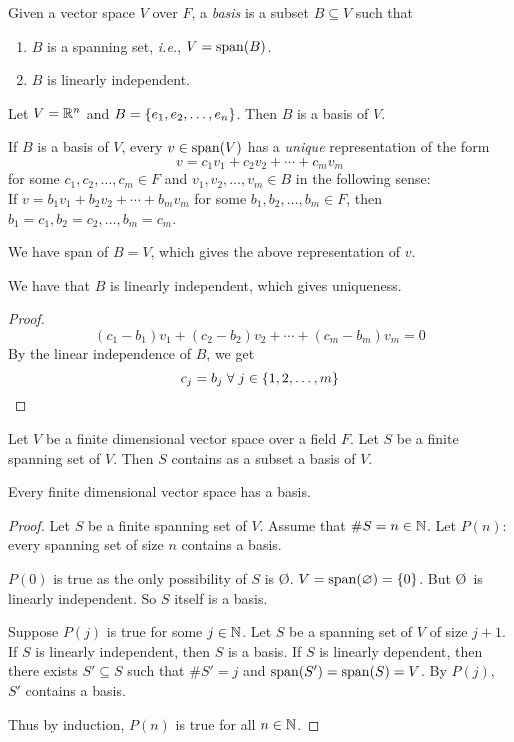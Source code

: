\begin{defn}[Basis] \label{defn:basis}
    Given a vector space $V$ over $F$, a \emph{basis} is a subset $B \subseteq V$ such that
    \begin{enumerate}[label=(\alph*)]
        \item $B$ is a spanning set, \textit{i.e.}, $V = \operatorname{span}(B)$.
        \item $B$ is linearly independent.
    \end{enumerate}
\end{defn}
\begin{example}
    Let $V = \mathbb{R}^{n}$ and $B = \set{e_{1}, e_{2}, \dots, e_{n}}$. Then $B$ is a basis of $V$.
\end{example}
\begin{rem}
    If $B$ is a basis of $V$, every $v \in \operatorname{span}(V)$ has a \emph{unique} representation of the form \[
        v = c_{1} v_{1} + c_{2} v_{2} + \cdots + c_{m} v_{m}
    \] for some $c_{1}, c_{2}, \dots, c_{m} \in F$ and $v_{1}, v_{2}, \dots, v_{m} \in B$ in the following sense: \\
    If $v = b_{1} v_{1} + b_{2} v_{2} + \cdots + b_{m} v_{m}$ for some $b_{1}, b_{2}, \dots, b_{m} \in F$, then $b_{1} = c_{1}, b_{2} = c_{2}, \dots, b_{m} = c_{m}$.

    We have span of $B = V$, which gives the above representation of $v$.

    We have that $B$ is linearly independent, which gives uniqueness.
    \begin{proof}
        \[
            (c_{1} - b_{1}) v_{1} + (c_{2} - b_{2}) v_{2} + \cdots + (c_{m} - b_{m}) v_{m} = 0
        \] By the linear independence of $B$, we get \[
            c_{j} = b_{j} \;\forall\; j \in \set{1, 2, \dots, m} \qedhere
        \]
    \end{proof}
\end{rem}

\begin{cor}[]
    Let $V$ be a finite dimensional vector space over a field $F$.
    Let $S$ be a finite spanning set of $V$.
    Then $S$ contains as a subset a basis of $V$.
\end{cor}
\begin{cor}[]
    Every finite dimensional vector space has a basis.
\end{cor}
\begin{proof}
    Let $S$ be a finite spanning set of $V$.
    Assume that $\#S = n \in \mathbb{N}$.
    Let $P(n)$: every spanning set of size $n$ contains a basis.

    $P(0)$ is true as the only possibility of $S$ is \O.
    $V = \operatorname{span}(\varnothing) = \{0\}$. But \O\ is linearly independent. So $S$ itself is a basis.

    Suppose $P(j)$ is true for some $j \in \mathbb{N}$.
    Let $S$ be a spanning set of $V$ of size $j + 1$.
    If $S$ is linearly independent, then $S$ is a basis.
    If $S$ is linearly dependent, then there exists $S' \subseteq S$ such that $\#S' = j$ and $\operatorname{span}(S') = \operatorname{span}(S) = V$.
    By $P(j)$, $S'$ contains a basis.

    Thus by induction, $P(n)$ is true for all $n \in \mathbb{N}$.
\end{proof}

